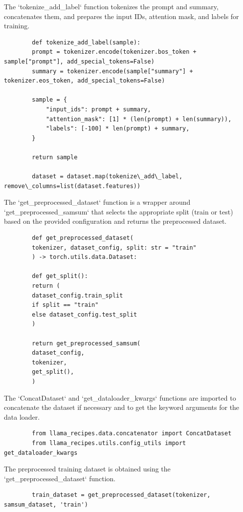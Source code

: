 \documentclass{solutionclass} %
\begin{document}
\begin{solution}
	The `tokenize\_add\_label` function tokenizes the prompt and summary, concatenates them, and prepares the input IDs, attention mask, and labels for training.
	\begin{lstlisting}
		def tokenize_add_label(sample):
		prompt = tokenizer.encode(tokenizer.bos_token + sample["prompt"], add_special_tokens=False)
		summary = tokenizer.encode(sample["summary"] + tokenizer.eos_token, add_special_tokens=False)
		
		sample = {
			"input_ids": prompt + summary,
			"attention_mask": [1] * (len(prompt) + len(summary)),
			"labels": [-100] * len(prompt) + summary,
		}
		
		return sample
		
		dataset = dataset.map(tokenize\_add\_label, remove\_columns=list(dataset.features))
	\end{lstlisting}
\end{solution}

\begin{solution}
	The `get\_preprocessed\_dataset` function is a wrapper around `get\_preprocessed\_samsum` that selects the appropriate split (train or test) based on the provided configuration and returns the preprocessed dataset.
	\begin{lstlisting}
		def get_preprocessed_dataset(
		tokenizer, dataset_config, split: str = "train"
		) -> torch.utils.data.Dataset:
		
		def get_split():
		return (
		dataset_config.train_split
		if split == "train"
		else dataset_config.test_split
		)
		
		return get_preprocessed_samsum(
		dataset_config,
		tokenizer,
		get_split(),
		)
	\end{lstlisting}
\end{solution}

\begin{solution}
	The `ConcatDataset` and `get\_dataloader\_kwargs` functions are imported to concatenate the dataset if necessary and to get the keyword arguments for the data loader.
	\begin{lstlisting}
		from llama_recipes.data.concatenator import ConcatDataset
		from llama_recipes.utils.config_utils import get_dataloader_kwargs
	\end{lstlisting}
\end{solution}

\begin{solution}
	The preprocessed training dataset is obtained using the `get\_preprocessed\_dataset` function.
	\begin{lstlisting}
		train_dataset = get_preprocessed_dataset(tokenizer, samsum_dataset, 'train')
	\end{lstlisting}
\end{solution}
\end{document}
